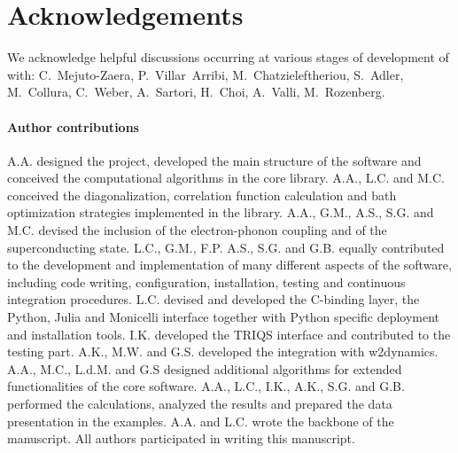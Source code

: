 \documentclass[edipack_sp.tex]{subfiles}
\begin{document}


\section*{Acknowledgements}
We acknowledge helpful discussions occurring at various stages of development of \NAME with: C.~Mejuto-Zaera, P.~Villar~Arribi, M.~Chatzieleftheriou, S.~Adler, M.~Collura, C.~Weber, A.~Sartori, H.~Choi, A.~Valli, M.~Rozenberg.    

\paragraph{Author contributions}
A.A. designed the project, developed the main structure of the software and conceived the computational algorithms in the core library. A.A., L.C. and M.C. conceived the diagonalization, correlation function  calculation and bath optimization strategies implemented in the library. A.A., G.M., A.S., S.G. and M.C. devised the inclusion of the electron-phonon coupling and of the superconducting state. 
L.C., G.M., F.P. A.S., S.G. and G.B. equally contributed to the development and implementation of many different aspects of the  software, including code writing, configuration, installation, testing and continuous integration procedures. 
L.C. devised and developed the C-binding layer, the Python, Julia and Monicelli interface together with Python specific deployment and installation tools. 
I.K. developed the TRIQS interface and contributed to the testing part. 
A.K., M.W. and G.S. developed the integration with w2dynamics.  
A.A., M.C., L.d.M. and G.S designed additional algorithms for extended functionalities of the core software.   
A.A., L.C., I.K., A.K., S.G. and G.B. performed the calculations, analyzed the results and prepared the data presentation in the examples.
A.A. and L.C. wrote the backbone of the manuscript.
All authors participated in writing this manuscript. 

\end{document}
